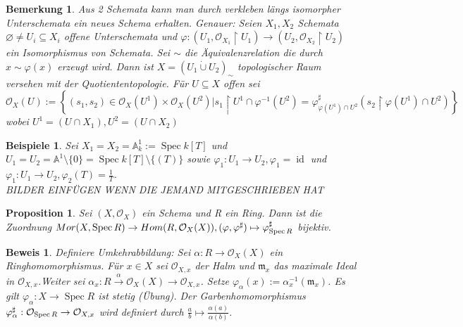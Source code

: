 \documentclass[a4paper,oneside]{scrbook}
\theoremstyle{break}
\newtheorem{Bem}[Def]{Bemerkung}
\newtheorem{Prop}[Def]{Proposition}
\newtheorem{Bsp}[Def]{Beispiele}
\theoremstyle{nonumberbreak}
\theoremstyle{nonumberplain}
\newtheorem{Bew}{Beweis}
\theoremstyle{break}
\renewcommand{\emptyset}{%
	\ensuremath{\varnothing}%
}
\newcommand{\Spec}{%
	\ensuremath{\operatorname{Spec}}%
}
\DeclareMathOperator{\id}{id}
\begin{document}
\begin{Bem}
	Aus 2 Schemata kann man durch verkleben längs isomorpher Unterschemata ein neues Schema erhalten.
	Genauer: Seien $X_1,X_2$ Schemata $\emptyset \neq U_i \subseteq X_i$ offene Unterschemata und $\varphi: \left( U_1, \mathcal{O}_{X_1} \restriction U_1 \right) \rightarrow \left( U_2, \mathcal{O}_{X_2} \restriction U_2 \right)$ ein Isomorphismus von Schemata. Sei $\sim$ die Äquivalenzrelation die durch $x \sim \varphi (x)$ erzeugt wird. Dann ist $X=(U_1 \dot\cup U_2)_\sim $ topologischer Raum versehen mit der Quotiententopologie. Für $U \subseteq X$ offen sei $\mathcal{O}_X(U):=\left\lbrace  (s_1,s_2) \in \mathcal{O}_X(U^1) \times \mathcal{O}_X(U^2) | s_1 \restriction U^1 \cap \varphi^{-1}(U^2) = \varphi^\sharp_{\varphi(U^1) \cap U^2}(s_2 \restriction \varphi(U^1) \cap U^2) \right\rbrace$ wobei $U^1=(U \cap X_1), U^2=(U \cap X_2)$
\end{Bem}

\begin{Bsp}
 Sei $X_1 = X_2 = \mathbb{A}^1_k:=\Spec k[T]$ und 
 $U_1=U_2=\mathbb{A}^1 \setminus \{0\} = \Spec k[T] \setminus \{(T)\}$ sowie $\varphi_1 : U_1 \rightarrow U_2, \varphi_1 = \id$ und $\varphi_1: U_1 \rightarrow U_2, \varphi_2(T) = \frac{1}{T} $.\\ BILDER EINFÜGEN WENN DIE JEMAND MITGESCHRIEBEN HAT
\end{Bsp}

\begin{Prop}
\label{prop:3.7}
	Sei $\left(X, \mathcal{O}_X \right)$ ein Schema und R ein Ring. Dann ist die Zuordnung $Mor(X, \Spec R) \rightarrow Hom(R, \mathcal{O}_X(X)), (\varphi, \varphi^\sharp) \mapsto \varphi^\sharp_{\Spec R}$ bijektiv.
\end{Prop}
\begin{Bew}
	Definiere Umkehrabbildung: Sei $\alpha : R \rightarrow \mathcal{O}_X(X)$ ein Ringhomomorphismus. Für $x \in X$ sei $\mathcal{O}_{X,x}$ der Halm und $\mathfrak{m}_x$ das maximale Ideal in $\mathcal{O}_{X,x}$.Weiter sei $\alpha_x: R \stackrel{\alpha}\rightarrow \mathcal{O}_{X}(X) \rightarrow \mathcal{O}_{X,x}$. Setze $\varphi_\alpha(x):=\alpha^{-1}_x(\mathfrak{m}_x)$. Es gilt $\varphi_\alpha : X \rightarrow \Spec R $ ist stetig (Übung). Der Garbenhomomorphismus $\varphi_\alpha^\sharp : \mathcal{O}_{\Spec R} \rightarrow \mathcal{O}_{X,x}$ wird definiert durch $\frac{a}{b} \mapsto \frac{\alpha(a)}{\alpha(b)}$.
\end{Bew}
\end{document}
